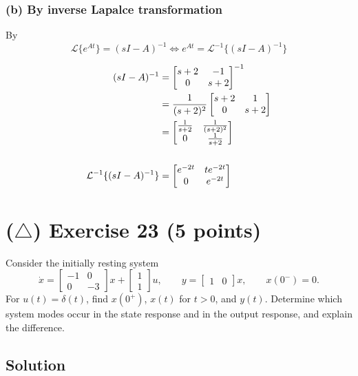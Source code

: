 \documentclass[12pt,a4paper]{article}
\begin{document}
\subsubsection*{(b) By inverse Lapalce transformation}

By
\[
\mathcal L \{e^{At}\} = (sI - A)^{-1} \Leftrightarrow  e^{At} = \mathcal{L}^{-1} \{ (sI - A)^{-1} \}
\]

\begin{align*}
	(sI - A)^{-1} &= \begin{bmatrix}
		s +2 & -1 \\
		0 & s + 2
	\end{bmatrix}^{-1} \\
	&={1\over (s + 2)^2} \begin{bmatrix}
		s + 2 & 1 \\
		0 & s + 2
	\end{bmatrix} \\
	&= \begin{bmatrix}
		{1\over s + 2} & {1\over (s + 2)^2} \\
		0& {1\over s + 2}
	\end{bmatrix} \\ \\
	\mathcal{L}^{-1} \{ (sI - A)^{-1} \} &= \begin{bmatrix}
		e^{-2t} & te^{-2t} \\
		0 & e^{-2t}
	\end{bmatrix}
\end{align*}



\vspace{3cm}
\clearpage
\section*{($\triangle$) Exercise 23 \hfill {\normalsize (5 points)}}
Consider the initially resting system
\[
\dot x=\begin{bmatrix}-1&0\\0&-3\end{bmatrix}x+
\begin{bmatrix}1\\1\end{bmatrix}u,\qquad
y=\begin{bmatrix}1&0\end{bmatrix}x,\qquad x(0^-)=0.
\]
For $u(t)=\delta(t)$, find $x(0^+)$, $x(t)$ for $t>0$, and $y(t)$. Determine which system modes occur in the state response and in the output response, and explain the difference.
\subsection*{Solution}
\end{document}
